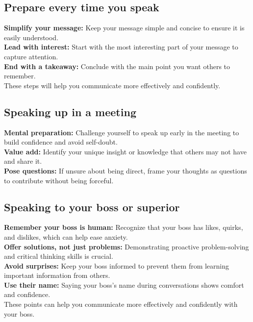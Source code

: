 \documentclass[12pt]{article}
\begin{document}
\subsection{Prepare every time you speak}
\textbf{Simplify your message:} Keep your message simple and concise to ensure it is easily understood.\\
\textbf{Lead with interest:}  Start with the most interesting part of your message to capture attention.\\
\textbf{End with a takeaway:}  Conclude with the main point you want others to remember.\\
These steps will help you communicate more effectively and confidently.

\subsection{Speaking up in a meeting}
\textbf{Mental preparation:} Challenge yourself to speak up early in the meeting to build confidence and avoid self-doubt.\\
\textbf{Value add:} Identify your unique insight or knowledge that others may not have and share it.\\
\textbf{Pose questions:} If unsure about being direct, frame your thoughts as questions to contribute without being forceful.

\subsection{Speaking to your boss or superior}
\textbf{Remember your boss is human:}  Recognize that your boss has likes, quirks, and dislikes, which can help ease anxiety.\\
\textbf{Offer solutions, not just problems:}  Demonstrating proactive problem-solving and critical thinking skills is crucial.\\
\textbf{Avoid surprises:}  Keep your boss informed to prevent them from learning important information from others.\\
\textbf{Use their name:}  Saying your boss's name during conversations shows comfort and confidence.\\
These points can help you communicate more effectively and confidently with your boss.

\end{document}
